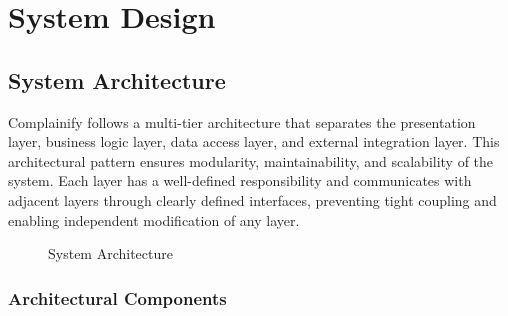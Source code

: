 \documentclass[12pt,a4paper]{report}
\begin{document}
\chapter{System Design}

\section{System Architecture}
Complainify follows a multi-tier architecture that separates the presentation layer, business logic layer, data access layer, and external integration layer. This architectural pattern ensures modularity, maintainability, and scalability of the system. Each layer has a well-defined responsibility and communicates with adjacent layers through clearly defined interfaces, preventing tight coupling and enabling independent modification of any layer.

\begin{figure}[H]
\centering
{}
\caption{System Architecture}
\end{figure}

\subsection{Architectural Components}
\end{document}
